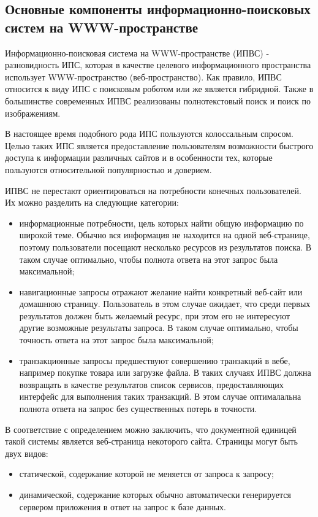 \subsection{Основные компоненты информационно-поисковых систем на WWW-пространстве}

Информационно-поисковая система на WWW-пространстве (ИПВС) - разновидность ИПС, которая в качестве целевого информационного пространства использует WWW-пространство (веб-пространство). Как правило, ИПВС относится к виду ИПС с поисковым роботом или же является гибридной. Также в большинстве современных ИПВС реализованы полнотекстовый поиск и поиск по изображениям.

В настоящее время подобного рода ИПС пользуются колоссальным спросом. Целью таких ИПС является предоставление пользователям возможности быстрого доступа к информации различных сайтов и в особенности тех, которые пользуются относительной популярностью и доверием.

ИПВС не перестают ориентироваться на потребности конечных пользователей. Их можно разделить на следующие категории:
\begin{itemize}
\item информационные потребности, цель которых найти общую информацию по широкой теме. Обычно вся информация не находится на одной веб-странице, поэтому пользователи посещают несколько ресурсов из результатов поиска. В таком случае оптимально, чтобы полнота ответа на этот запрос была максимальной;
\item навигационные запросы отражают желание найти конкретный веб-сайт или домашнюю страницу. Пользователь в этом случае ожидает, что среди первых результатов должен быть желаемый ресурс, при этом его не интересуют другие возможные результаты запроса. В таком случае оптимально, чтобы точность ответа на этот запрос была максимальной;
\item транзакционные запросы предшествуют совершению транзакций в вебе, например покупке товара или загрузке файла. В таких случаях ИПВС должна возвращать в качестве результатов список сервисов, предоставляющих интерфейс для выполнения таких транзакций. В этом случае оптималальна полнота ответа на запрос без существенных потерь в точности.
\end{itemize}

В соответствие с определением можно заключить, что документной единицей такой системы является веб-страница некоторого сайта. Страницы могут быть двух видов:
\begin{itemize}
\item статической, содержание которой не меняется от запроса к запросу;
\item динамической, содержание которых обычно автоматически генерируется сервером приложения в ответ на запрос к базе данных.
\end{itemize}

